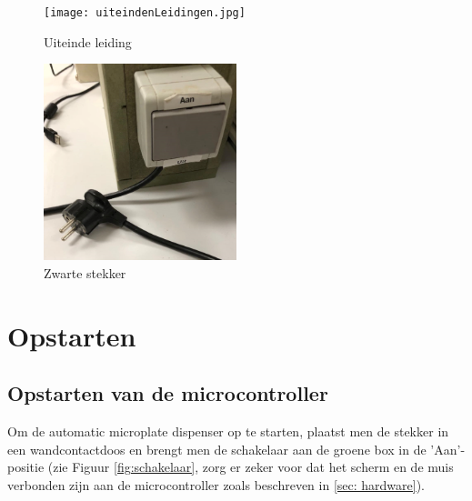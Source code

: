 \documentclass[a4paper,twoside,kulak]{kulakreport} %
\begin{document}
\begin{figure}[h]
	\centering
	\texttt{[image: uiteindenLeidingen.jpg]}
	\caption{Uiteinde leiding}
	\label{fig: uiteinde leiding}
	
\end{figure} 

\begin{figure}[h]
	\centering
	\includegraphics[width=0.5\textwidth]{stekker.png}
	\caption{Zwarte stekker}
	\label{fig:stekker}
	
\end{figure} 


\chapter{Opstarten}
\label{hoofdstuk opstarten}

\section{Opstarten van de microcontroller}
Om de automatic microplate dispenser op te starten, plaatst men de stekker in een wandcontactdoos en brengt men de schakelaar aan de groene box in de 'Aan'-positie (zie Figuur \ref{fig:schakelaar}, zorg er zeker voor dat het scherm en de muis verbonden zijn aan de microcontroller zoals beschreven in \ref{sec: hardware}).
\end{document}
